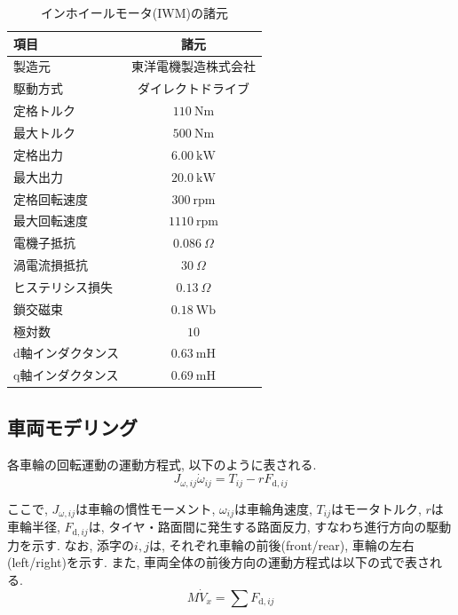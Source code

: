 \documentclass[11pt,a4paper,oneside,onecolumn,fleqn,dvipdfmx]{jsarticle}
\begin{document}
\begin{table}[tb]
    \centering
    \caption{インホイールモータ(IWM)の諸元}
    \label{table:2_Kanon_IWM}
    \begin{tabular}{l c}
        \toprule
        項目 & 諸元 \\
        \midrule
        製造元       & 東洋電機製造株式会社 \\
        駆動方式     & ダイレクトドライブ \\
        定格トルク   & $110\ \mathrm{Nm}$ \\
        最大トルク   & $500\ \mathrm{Nm}$ \\
        定格出力     & $6.00\ \mathrm{kW}$ \\
        最大出力     & $20.0\ \mathrm{kW}$ \\
        定格回転速度 & $300\ \mathrm{rpm}$ \\
        最大回転速度 & $1110\ \mathrm{rpm}$ \\
        電機子抵抗   & $0.086\ \Omega$ \\
        渦電流損抵抗     & $30\ \Omega$ \\
        ヒステリシス損失 & $0.13\ \Omega$ \\
        鎖交磁束     & $0.18\ \mathrm{Wb}$ \\
        極対数       & $10$ \\
        d軸インダクタンス & $0.63\ \mathrm{mH}$ \\
        q軸インダクタンス & $0.69\ \mathrm{mH}$ \\
        \bottomrule
    \end{tabular}
\end{table}

\subsection{車両モデリング}
各車輪の回転運動の運動方程式, 以下のように表される. 
\begin{equation}
\label{eq:2_rotate_eq}
J_{\omega,ij} \dot{\omega}_{ij} = T_{ij} - rF_{\mathrm{d},{ij}}
\end{equation}

ここで, $J_{\omega,ij}$は車輪の慣性モーメント, ${\omega}_{ij}$は車輪角速度, $T_{ij}$はモータトルク, $r$は車輪半径, $F_{\mathrm{d},{ij}}$は, タイヤ・路面間に発生する路面反力, すなわち進行方向の駆動力を示す. 
なお, 添字の$i,j$は, それぞれ車輪の前後(front/rear), 車輪の左右(left/right)を示す. 
また, 車両全体の前後方向の運動方程式は以下の式で表される. 
\begin{equation}
\label{eq:2_x_eq}
M\dot{V}_x = \sum{F_{\mathrm{d},{ij}}}
\end{equation}
\end{document}
